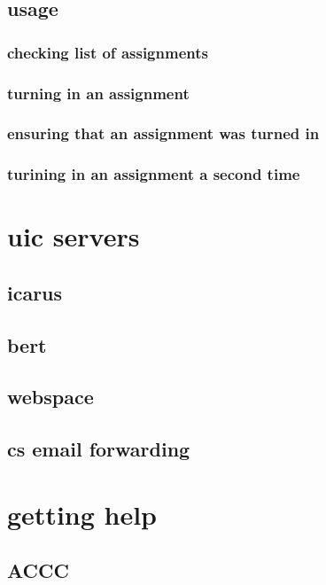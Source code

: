 \documentclass[hyperref={pdfpagelabels=false}]{beamer}
\begin{document}
\subsection{usage}
\frame
{
    \frametitle{checking list of assignments}
}
\frame
{
    \frametitle{turning in an assignment}
}
\frame
{
    \frametitle{ensuring that an assignment was turned in}
}
\frame
{
    \frametitle{turining in an assignment a second time}
}
\section{uic servers}
\subsection{icarus}
\subsection{bert}
\subsection{webspace}
\subsection{cs email forwarding}
\section{getting help}
\subsection{ACCC}
\subsection{}
\end{document}
